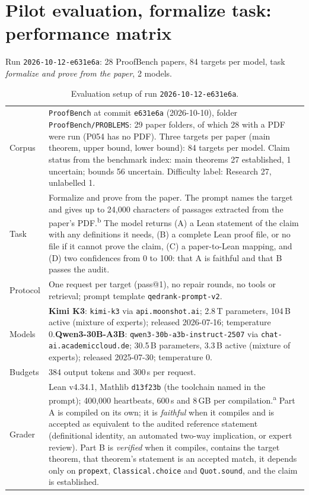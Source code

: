 \documentclass[11pt]{article}
\begin{document}
\section*{Pilot evaluation, formalize task: performance matrix}
Run \texttt{2026-10-12-e631e6a}: 28 ProofBench papers, 84 targets per model, task \emph{formalize and prove from the paper}, 2 models.

\begin{table}[!htbp]
\centering
\caption{Evaluation setup of run \texttt{2026-10-12-e631e6a}.}
\label{tab:f-setup}
\small
\begin{tabularx}{\linewidth}{@{}>{\raggedright\arraybackslash}p{2.4cm}>{\raggedright\arraybackslash}X@{}}
\toprule
Corpus & \texttt{ProofBench} at commit \texttt{e631e6a} (2026-10-10), folder \texttt{ProofBench/PROBLEMS}: 29 paper folders, of which 28 with a PDF were run (P054 has no PDF). Three targets per paper (main theorem, upper bound, lower bound): 84 targets per model. Claim status from the benchmark index: main theorems 27 established, 1 uncertain; bounds 56 uncertain. Difficulty label: Research 27, unlabelled 1. \\
Task & Formalize and prove from the paper. The prompt names the target and gives up to 24{,}000 characters of passages extracted from the paper's PDF.\textsuperscript{b} The model returns (A) a Lean statement of the claim with any definitions it needs, (B) a complete Lean proof file, or no file if it cannot prove the claim, (C) a paper-to-Lean mapping, and (D) two confidences from 0 to 100: that A is faithful and that B passes the audit. \\
Protocol & One request per target (pass@1), no repair rounds, no tools or retrieval; prompt template \texttt{qedrank-prompt-v2}. \\
Models & \textbf{Kimi K3}: \texttt{kimi-k3} via \texttt{api.moonshot.ai}; 2.8\,T parameters, 104\,B active (mixture of experts); released 2026-07-16; temperature 0.\newline \textbf{Qwen3-30B-A3B}: \texttt{qwen3-30b-a3b-instruct-2507} via \texttt{chat-ai.academiccloud.de}; 30.5\,B parameters, 3.3\,B active (mixture of experts); released 2025-07-30; temperature 0. \\
Budgets & 16{,}384 output tokens and 300\,s per request. \\
Grader & Lean v4.34.1, Mathlib \texttt{d13f23b} (the toolchain named in the prompt); 400{,}000 heartbeats, 600\,s and 8\,GB per compilation.\textsuperscript{a} Part A is compiled on its own; it is \emph{faithful} when it compiles and is accepted as equivalent to the audited reference statement (definitional identity, an automated two-way implication, or expert review). Part B is \emph{verified} when it compiles, contains the target theorem, that theorem's statement is an accepted match, it depends only on \texttt{propext}, \texttt{Classical.choice} and \texttt{Quot.sound}, and the claim is established. \\

\end{tabularx}
\end{table}
\end{document}
